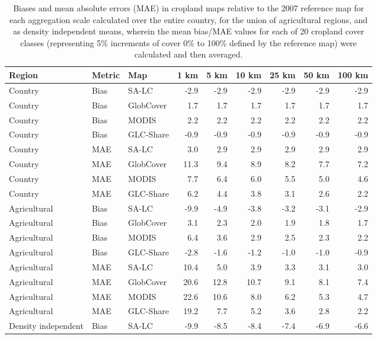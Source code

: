 \begin{longtable}{lllrrrrrr}
\caption{Biases and mean absolute errors (MAE) in cropland maps relative to the 2007 reference map for each aggregation scale calculated over the entire country, for the union of agricultural regions, and as density independent means, wherein the mean bias/MAE values for each of 20 cropland cover classes (representing 5\% increments of cover 0\% to 100\% defined by the reference map) were calculated and then averaged.} \\ 
  \hline
Region & Metric & Map & 1 km & 5 km & 10 km & 25 km & 50 km & 100 km \\ 
  \hline
Country & Bias & SA-LC & -2.9 & -2.9 & -2.9 & -2.9 & -2.9 & -2.9 \\ 
  Country & Bias & GlobCover & 1.7 & 1.7 & 1.7 & 1.7 & 1.7 & 1.7 \\ 
  Country & Bias & MODIS & 2.2 & 2.2 & 2.2 & 2.2 & 2.2 & 2.2 \\ 
  Country & Bias & GLC-Share & -0.9 & -0.9 & -0.9 & -0.9 & -0.9 & -0.9 \\ 
  Country & MAE & SA-LC & 3.0 & 2.9 & 2.9 & 2.9 & 2.9 & 2.9 \\ 
  Country & MAE & GlobCover & 11.3 & 9.4 & 8.9 & 8.2 & 7.7 & 7.2 \\ 
  Country & MAE & MODIS & 7.7 & 6.4 & 6.0 & 5.5 & 5.0 & 4.6 \\ 
  Country & MAE & GLC-Share & 6.2 & 4.4 & 3.8 & 3.1 & 2.6 & 2.2 \\ 
  Agricultural & Bias & SA-LC & -9.9 & -4.9 & -3.8 & -3.2 & -3.1 & -2.9 \\ 
  Agricultural & Bias & GlobCover & 3.1 & 2.3 & 2.0 & 1.9 & 1.8 & 1.7 \\ 
  Agricultural & Bias & MODIS & 6.4 & 3.6 & 2.9 & 2.5 & 2.3 & 2.2 \\ 
  Agricultural & Bias & GLC-Share & -2.8 & -1.6 & -1.2 & -1.0 & -1.0 & -0.9 \\ 
  Agricultural & MAE & SA-LC & 10.4 & 5.0 & 3.9 & 3.3 & 3.1 & 3.0 \\ 
  Agricultural & MAE & GlobCover & 20.6 & 12.8 & 10.7 & 9.1 & 8.1 & 7.4 \\ 
  Agricultural & MAE & MODIS & 22.6 & 10.6 & 8.0 & 6.2 & 5.3 & 4.7 \\ 
  Agricultural & MAE & GLC-Share & 19.2 & 7.7 & 5.2 & 3.6 & 2.8 & 2.2 \\ 
  Density independent & Bias & SA-LC & -9.9 & -8.5 & -8.4 & -7.4 & -6.9 & -6.6 \\ 

\end{longtable}
